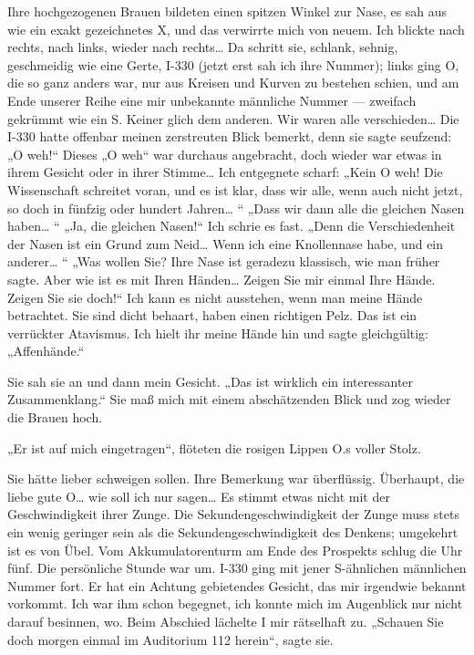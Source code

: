 Ihre hochgezogenen Brauen bildeten einen spitzen Winkel zur Nase,
es sah aus wie ein exakt gezeichnetes X, und das verwirrte mich von
neuem. Ich blickte nach rechts, nach links, wieder nach rechts\ldots{}
Da schritt sie, schlank, sehnig, geschmeidig wie eine Gerte, I-330
(jetzt erst sah ich ihre Nummer); links ging O, die so ganz anders
war, nur aus Kreisen und Kurven zu bestehen schien, und am Ende
unserer Reihe eine mir unbekannte männliche Nummer — zweifach
gekrümmt wie ein S. Keiner glich dem anderen. Wir waren alle
verschieden\ldots{} Die I-330 hatte offenbar meinen zerstreuten Blick
bemerkt, denn sie sagte seufzend: „O weh!“ Dieses „O weh“ war
durchaus angebracht, doch wieder war etwas in ihrem Gesicht oder in
ihrer Stimme\ldots{} Ich entgegnete scharf: „Kein O weh! Die
Wissenschaft schreitet voran, und es ist klar, dass wir alle, wenn
auch nicht jetzt, so doch in fünfzig oder hundert Jahren\ldots{} “ „Dass
wir dann alle die gleichen Nasen haben\ldots{} “ „Ja, die gleichen
Nasen!“ Ich schrie es fast. „Denn die Verschiedenheit der Nasen ist
ein Grund zum Neid\ldots{} Wenn ich eine Knollennase habe, und ein
anderer\ldots{} “ „Was wollen Sie? Ihre Nase ist geradezu klassisch, wie
man früher sagte. Aber wie ist es mit Ihren Händen\ldots{} Zeigen Sie
mir einmal Ihre Hände. Zeigen Sie sie doch!“ Ich kann es nicht
ausstehen, wenn man meine Hände betrachtet. Sie sind dicht behaart,
haben einen richtigen Pelz. Das ist ein verrückter Atavismus. Ich
hielt ihr meine Hände hin und sagte gleichgültig: „Affenhände.“

Sie sah sie an und dann mein Gesicht. „Das ist wirklich ein
interessanter Zusammenklang.“ Sie maß mich mit einem abschätzenden
Blick und zog wieder die Brauen hoch.

„Er ist auf mich eingetragen“, flöteten die rosigen Lippen O.s
voller Stolz.

Sie hätte lieber schweigen sollen. Ihre Bemerkung war überflüssig.
Überhaupt, die liebe gute O\ldots{} wie soll ich nur sagen\ldots{} Es stimmt
etwas nicht mit der Geschwindigkeit ihrer Zunge. Die
Sekundengeschwindigkeit der Zunge muss stets ein wenig geringer
sein als die Sekundengeschwindigkeit des Denkens; umgekehrt ist es
von Übel. Vom Akkumulatorenturm am Ende des Prospekts schlug die
Uhr fünf. Die persönliche Stunde war um. I-330 ging mit jener
S-ähnlichen männlichen Nummer fort. Er hat ein Achtung gebietendes
Gesicht, das mir irgendwie bekannt vorkommt. Ich war ihm schon
begegnet, ich konnte mich im Augenblick nur nicht darauf besinnen,
wo. Beim Abschied lächelte I mir rätselhaft zu. „Schauen Sie doch
morgen einmal im Auditorium 112 herein“, sagte sie.


